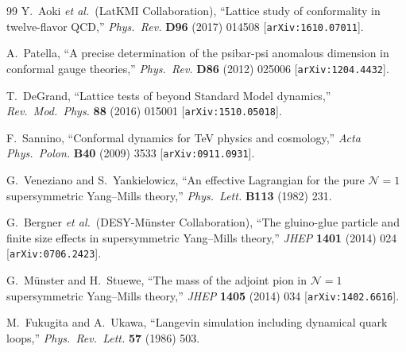 \documentclass[11pt,a4paper]{article}
\theoremstyle{plain}
\theoremstyle{definition}
\theoremstyle{remark}
\begin{document}
\begin{thebibliography}{99}
  Y.~Aoki \textit{et al.}\ (LatKMI Collaboration),
  ``Lattice study of conformality in twelve-flavor QCD,''
  \textit{Phys.~Rev.} \textbf{D96} (2017) 014508
  [\texttt{arXiv:1610.07011}].

  A.~Patella,
  ``A precise determination of the psibar-psi anomalous dimension
  in conformal gauge theories,''
  \textit{Phys.~Rev.} \textbf{D86} (2012) 025006
  [\texttt{arXiv:1204.4432}].

  T.~DeGrand,
  ``Lattice tests of beyond Standard Model dynamics,''
  \textit{Rev.~Mod.~Phys.} \textbf{88} (2016) 015001
  [\texttt{arXiv:1510.05018}].

  F.~Sannino,
  ``Conformal dynamics for TeV physics and cosmology,''
  \textit{Acta Phys.~Polon.} \textbf{B40} (2009) 3533
  [\texttt{arXiv:0911.0931}].

  G.~Veneziano and S.~Yankielowicz,
  ``An effective Lagrangian for the pure $\mathcal{N}=1$
  supersymmetric Yang--Mills theory,''
  \textit{Phys.~Lett.} \textbf{B113} (1982) 231.

  G.~Bergner \textit{et al.}\ (DESY-M\"unster Collaboration),
  ``The gluino-glue particle and finite size effects in
  supersymmetric Yang--Mills theory,''
  \textit{JHEP} \textbf{1401} (2014) 024
  [\texttt{arXiv:0706.2423}].

  G.~M\"unster and H.~Stuewe,
  ``The mass of the adjoint pion in $\mathcal{N}=1$
  supersymmetric Yang--Mills theory,''
  \textit{JHEP} \textbf{1405} (2014) 034
  [\texttt{arXiv:1402.6616}].

  M.~Fukugita and A.~Ukawa,
  ``Langevin simulation including dynamical quark loops,''
  \textit{Phys.~Rev.~Lett.} \textbf{57} (1986) 503.

\end{thebibliography}
\end{document}
